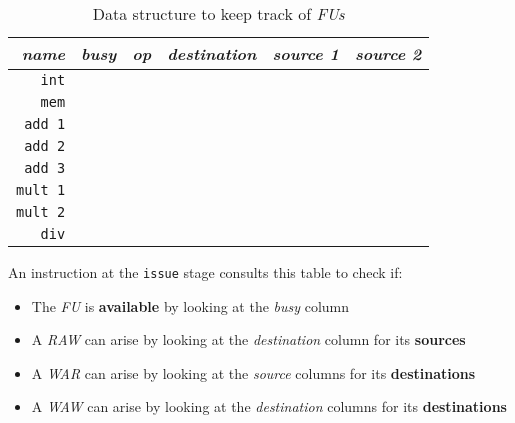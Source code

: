 \documentclass[english]{article}
\begin{document}
\begin{table}
  \bigskip
  \centering
  \begin{tabular}{r|c|cccc}
    \hline
    \textit{name}   & \textit{busy} & \textit{op} & \textit{destination} & \textit{source 1} & \textit{source 2} \\ \hline
    \texttt{int}    &               &             &                      &                   &                   \\
    \texttt{mem}    &               &             &                      &                   &                   \\ \hline
    \texttt{add 1}  &               &             &                      &                   &                   \\
    \texttt{add 2}  &               &             &                      &                   &                   \\
    \texttt{add 3}  &               &             &                      &                   &                   \\ \hline
    \texttt{mult 1} &               &             &                      &                   &                   \\
    \texttt{mult 2} &               &             &                      &                   &                   \\ \hline
    \texttt{div}    &               &             &                      &                   &                   \\
  \end{tabular}
  \caption{Data structure to keep track of \textit{FUs}}
  \label{tab:data-structure-keep-track-functional-units}
  \bigskip
\end{table}

An instruction at the \texttt{issue} stage consults this table to check if:

\begin{itemize}
  \item The \textit{FU} is \textbf{available} by looking at the \textit{busy} column
  \item A \textit{RAW} can arise by looking at the \textit{destination} column for its \textbf{sources}
  \item A \textit{WAR} can arise by looking at the \textit{source} columns for its \textbf{destinations}
  \item A \textit{WAW} can arise by looking at the \textit{destination} columns for its \textbf{destinations}
\end{itemize}
\end{document}
